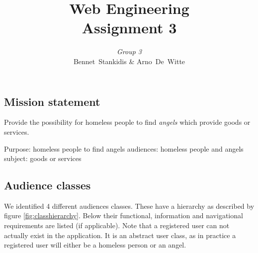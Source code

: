 \documentclass[a4paper]{report}
\author{\textit{Group 3}\\ Bennet~Stankidis \& Arno~De~Witte}
\title{{\Huge Web Engineering}\\Assignment 3}
\begin{document}
\maketitlepage
\tableofcontents

\chapter{}
\section{Mission statement}
Provide the possibility for homeless people to find \emph{angels} which provide goods or services.

Purpose: homeless people to find angels
audiences: homeless people and angels
subject: goods or services

\section{Audience classes}
We identified 4 different audiences classes. These have a hierarchy as described by figure \ref{fig:classhierarchy}. Below their functional, information and navigational requirements are listed (if applicable). Note that a registered user can not actually exist in the application. It is an abstract user class, as in practice a registered user will either be a homeless person or an angel.
\end{document}
